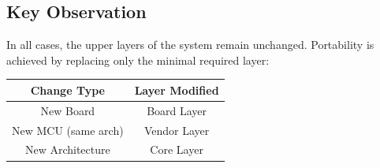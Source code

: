 \subsection*{Key Observation}

In all cases, the upper layers of the system remain unchanged. Portability is achieved by replacing only the minimal required layer:

\begin{center}
\begin{tabular}{|c|c|}
\hline
\textbf{Change Type} & \textbf{Layer Modified} \\
\hline
New Board & Board Layer \\
\hline
New MCU (same arch) & Vendor Layer \\
\hline
New Architecture & Core Layer \\
\hline
\end{tabular}
\end{center}